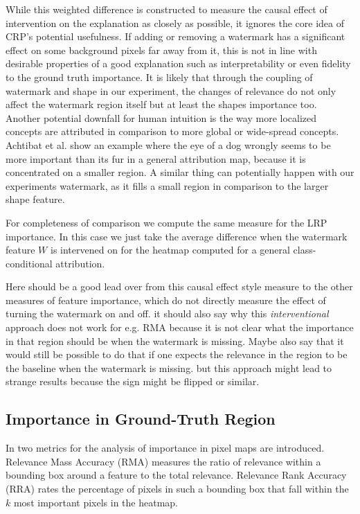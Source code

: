 While this weighted difference is constructed to measure the causal effect of intervention on the explanation as closely as possible, it ignores the core idea of CRP's potential usefulness. If adding or removing a watermark has a significant effect on some background pixels far away from it, this is not in line with desirable properties of a good explanation such as interpretability or even fidelity to the ground truth importance. It is likely that through the coupling of watermark and shape in our experiment, the changes of relevance do not only affect the watermark region itself but at least the shapes importance too. 
Another potential downfall for human intuition is the way more localized concepts are attributed in comparison to more global or wide-spread concepts. Achtibat et al. \cite{Achtibat2022} show an example where the eye of a dog wrongly seems to be more important than its fur in a general attribution map, because it is concentrated on a smaller region. A similar thing can potentially happen with our experiments watermark, as it fills a small region in comparison to the larger shape feature. 

For completeness of comparison we compute the same measure for the LRP importance. In this case we just take the average difference when the watermark feature $W$ is intervened on for the heatmap computed for a general class-conditional attribution. 

Here should be a good lead over from this causal effect style measure to the other measures of feature importance, which do not directly measure the effect of turning the watermark on and off. it should also say why this \textit{interventional} approach does not work for e.g. RMA because it is not clear what the importance in that region should be when the watermark is missing. Maybe also say that it would still be possible to do that if one expects the relevance in the region to be the baseline when the watermark is missing. but this approach might lead to strange results because the sign might be flipped or similar.

\subsection{Importance in Ground-Truth Region}
In \cite{Arras2022} two metrics for the analysis of importance in pixel maps are introduced. Relevance Mass Accuracy (RMA) measures the ratio of relevance within a bounding box around a feature to the total relevance. Relevance Rank Accuracy (RRA) rates the percentage of pixels in such a bounding box that fall within the $k$ most important pixels in the heatmap.


